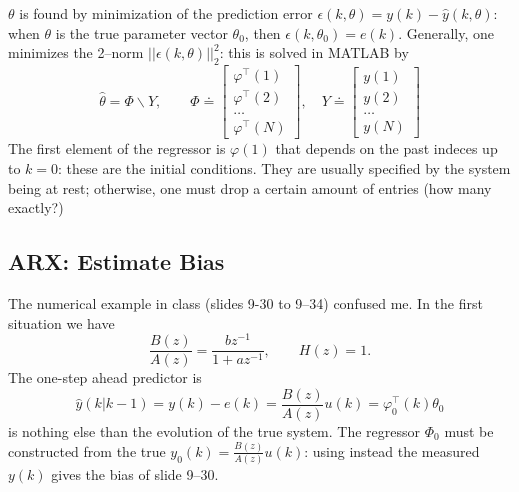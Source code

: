 $\theta$ is found by minimization of the prediction error $\epsilon(k,\theta) = y(k) - \hat{y}(k,\theta)$: when $\theta$ is the true parameter vector $\theta_0$, then $\epsilon(k,\theta_0)=e(k)$. Generally, one minimizes the 2--norm $||\epsilon(k,\theta)||_2^2$: this  is solved in MATLAB by
\begin{equation}
  \label{eq:ARX-solution}
  \hat{\theta} = \Phi \backslash Y,\hspace{2em} \Phi \doteq
  \begin{bmatrix}
    \varphi^\top(1) \\ \varphi^\top(2) \\ \ldots \\ \varphi^\top(N)
  \end{bmatrix}, \hspace{1em} Y \doteq
  \begin{bmatrix}
    y(1) \\ y(2) \\ \ldots \\ y(N)
  \end{bmatrix}
\end{equation}
The first element of the regressor is $\varphi(1)$ that depends on the past indeces up to $k=0$: these are the initial conditions. They are usually specified by the system being at rest; otherwise, one must drop a certain amount of entries (how many exactly?)

\subsection{ARX: Estimate Bias}
\label{sec:estimate-bias-ARX}

The numerical example in class (slides 9-30 to 9--34) confused me. In the first situation we have
\begin{equation*}
  \frac{B(z)}{A(z)} = \frac{bz^{-1}}{1 + az^{-1}}, \hspace{2em} H(z)=1.
\end{equation*}
The one-step ahead predictor is
\begin{equation*}
  \hat{y}(k|k-1) = y(k) - e(k) = \frac{B(z)}{A(z)}u(k) = \varphi_0^\top(k)\theta_0
\end{equation*}
is nothing else than the evolution of the true system. The regressor $\Phi_0$ must be constructed from the true $y_0(k) = \frac{B(z)}{A(z)}u(k)$: using instead the measured $y(k)$ gives the bias of slide 9--30.

